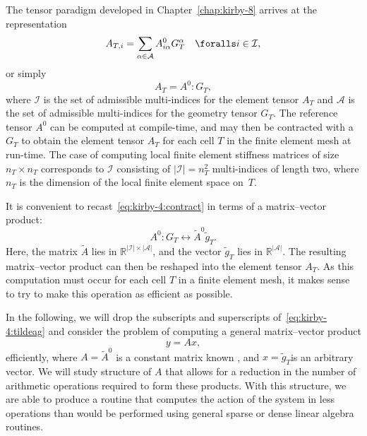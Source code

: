 The tensor paradigm developed in Chapter~\ref{chap:kirby-8} arrives at
the representation
\begin{equation}
  A_{T,i} = \sum_{\alpha\in\mathcal{A}} A^0_{i\alpha} G_T^{\alpha}
  \quad \foralls i \in \mathcal{I},
\end{equation}
or simply
\begin{equation} \label{eq:kirby-4:contract}
  A_T = A^0 : G_T,
\end{equation}
where $\mathcal{I}$ is the set of admissible multi-indices for the element
tensor $A_T$ and $\mathcal{A}$ is the set of admissible multi-indices
for the geometry tensor $G_T$. The reference tensor $ A^0 $ can be
computed at compile-time, and may then be contracted with a $ G_T $ to
obtain the element tensor $A_T$ for each cell $T$ in the finite element
mesh at run-time. The case of computing local finite element stiffness
matrices of size $n_T \times n_T$ corresponds to $\mathcal{I}$ consisting
of $|\mathcal{I}| = n_T^2$ multi-indices of length two, where $n_T$
is the dimension of the local finite element space on~$T$.

It is convenient to recast~\eqref{eq:kirby-4:contract} in terms of a
matrix--vector product:
\begin{equation} \label{eq:kirby-4:tildeag}
  A^0 : G_T \leftrightarrow \tilde{A}^0 \tilde{g}_T.
\end{equation}
Here, the matrix $ \tilde{A} $ lies in $ \mathbb{R}^{|\mathcal{I}| \times
  |\mathcal{A}|} $, and the vector $ \tilde{g}_{T} $ lies in $
\mathbb{R}^{|\mathcal{A}|} $. The resulting matrix--vector product can
then be reshaped into the element tensor $A_T$. As this computation
must occur for each cell $T$ in a finite element mesh, it makes
sense to try to make this operation as efficient as possible.

In the following, we will drop the subscripts and superscripts
of~\eqref{eq:kirby-4:tildeag} and consider the problem of computing a
general matrix--vector product
\begin{equation}
y = A x,
\end{equation}
efficiently, where $ A = \tilde{A}^0 $ is a constant matrix
known \apriori{}, and $x = \tilde{g}_T $is an arbitrary vector. We
will study structure of $ A $ that allows for a reduction in the
number of arithmetic operations required to form these products. With
this structure, we are able to produce a routine that computes the
action of the system in less operations than would be performed using
general sparse or dense linear algebra routines.

